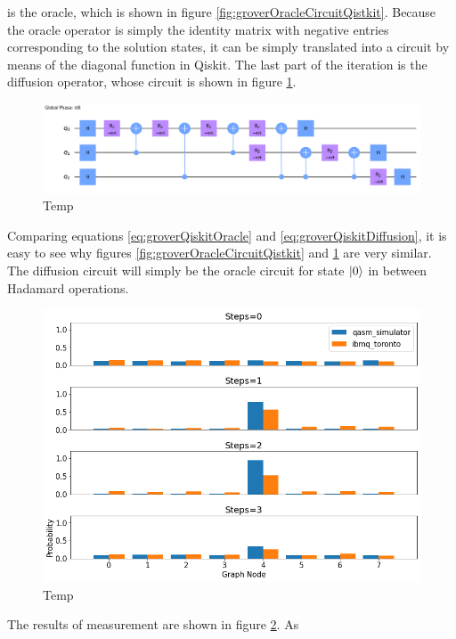 \documentclass[../../dissertation.tex]{subfiles}
\begin{document}
is the oracle, which is shown in figure \ref{fig:groverOracleCircuitQistkit}.
Because the oracle operator is simply the identity matrix with negative entries
corresponding to the solution states, it can be simply translated into a
circuit by means of the diagonal function in Qiskit. The last part of the
iteration is the diffusion operator, whose circuit is shown in figure
\ref{fig:groverDiffCircuitQistkit}.
\begin{figure}[!h]
	\centering
	\includegraphics[scale=0.25]{img/Qiskit/GroverQiskit/Circuits/GroverQiskitCircDiff_N3_M4_S3.png}
	\caption{Temp}
	\label{fig:groverDiffCircuitQistkit}
\end{figure}
Comparing equations \ref{eq:groverQiskitOracle} and
\ref{eq:groverQiskitDiffusion}, it is easy to see why figures
\ref{fig:groverOracleCircuitQistkit} and \ref{fig:groverDiffCircuitQistkit} are
very similar. The diffusion circuit will simply be the oracle circuit for state
$\ket{0}$ in between Hadamard operations.
\begin{figure}[!h]
	\centering
	\includegraphics[scale=0.40]{img/Qiskit/GroverQiskit/GroverQiskitSearch_N3_M4_S0123}
	\caption{Temp}
	\label{fig:groverQiskitDist}
\end{figure}
The results of measurement are shown in figure \ref{fig:groverQiskitDist}. As
\end{document}

